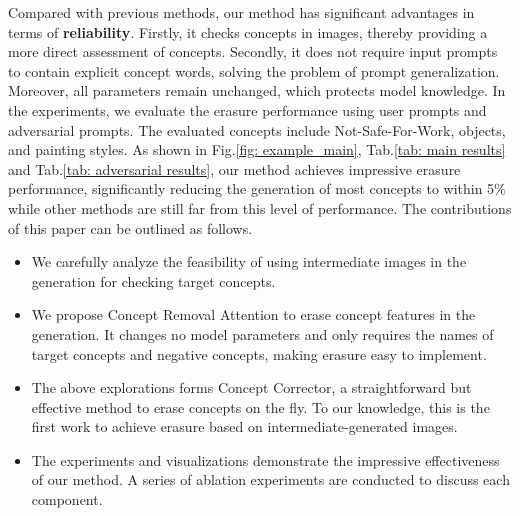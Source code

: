 Compared with previous methods, our method has significant advantages in terms of \textbf{reliability}. Firstly, it checks concepts in images, thereby providing a more direct assessment of concepts. Secondly, it does not require input prompts to contain explicit concept words, solving the problem of prompt generalization. Moreover, all parameters remain unchanged, which protects model knowledge. In the experiments, we evaluate the erasure performance using user prompts and adversarial prompts. The evaluated concepts include Not-Safe-For-Work, objects, and painting styles. As shown in Fig.\ref{fig: example_main}, Tab.\ref{tab: main results} and Tab.\ref{tab: adversarial results}, our method achieves impressive erasure performance, significantly reducing the generation of most concepts to within 5\% while other methods are still far from this level of performance. The contributions of this paper can be outlined as follows.

\begin{itemize}
    \item We carefully analyze the feasibility of using intermediate images in the generation for checking target concepts. 
    \item We propose Concept Removal Attention to erase concept features in the generation. It changes no model parameters and only requires the names of target concepts and negative concepts, making erasure easy to implement.
    \item The above explorations forms Concept Corrector, a straightforward but effective method to erase concepts on the fly. To our knowledge, this is the first work to achieve erasure based on intermediate-generated images.
    \item The experiments and visualizations demonstrate the impressive effectiveness of our method. A series of ablation experiments are conducted to discuss each component.
\end{itemize}
